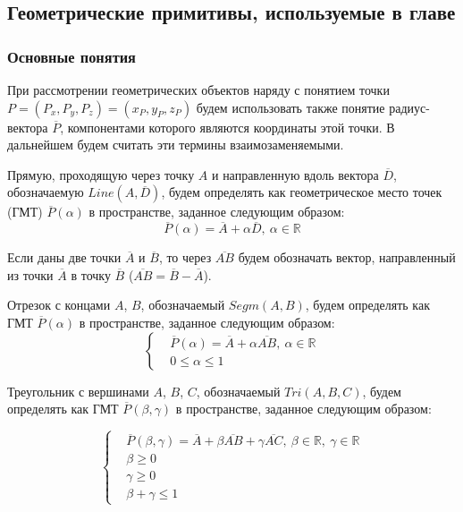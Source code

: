 \subsection{Геометрические примитивы, используемые в главе}

\subsubsection{Основные понятия}

При рассмотрении геометрических объектов наряду с понятием точки $P = (P_x, P_y, P_z) = (x_P, y_P, z_P)$ будем использовать также понятие радиус-вектора $\overline{P}$, компонентами которого являются координаты этой точки.
В дальнейшем будем считать эти термины взаимозаменяемыми.

Прямую, проходящую через точку $A$ и направленную вдоль вектора $\overline{D}$, обозначаемую $Line(A, \overline{D})$, будем определять как геометрическое место точек\label{term:gmt} (ГМТ\label{abbr:gmt}) $\overline{P}(\alpha)$ в пространстве, заданное следующим образом:
\begin{equation}\label{eqn:text_1_geo_prim_line}
	\overline{P}(\alpha) = \overline{A} + \alpha \overline{D}, \ \alpha \in \mathbb{R}
\end{equation}

Если даны две точки $\overline{A}$ и $\overline{B}$, то через $\overline{AB}$ будем обозначать вектор, направленный из точки $\overline{A}$ в точку $\overline{B}$ ($\overline{AB} = \overline{B} - \overline{A}$).

Отрезок с концами $A$, $B$, обозначаемый $Segm(A, B)$, будем определять как ГМТ $\overline{P}(\alpha)$ в пространстве, заданное следующим образом:
\begin{equation}\label{eqn:text_1_geo_prim_segment}
	\left\{
		\begin{aligned}
			& \overline{P}(\alpha) = \overline{A} + \alpha \overline{AB}, \ \alpha \in \mathbb{R} \\
			& 0 \le \alpha \le 1
		\end{aligned}
	\right.
\end{equation}

Треугольник с вершинами $A$, $B$, $C$, обозначаемый $Tri(A, B, C)$, будем определять как ГМТ $\overline{P}(\beta, \gamma)$ в пространстве, заданное следующим образом:

\begin{equation}\label{eqn:text_1_geo_prim_triangle}
	\left\{
		\begin{aligned}
			& \overline{P}(\beta, \gamma) = \overline{A} + \beta \overline{AB} + \gamma \overline{AC}, \ \beta \in \mathbb{R}, \ \gamma \in \mathbb{R} \\
			& \beta \ge 0 \\
			& \gamma \ge 0 \\
			& \beta + \gamma \le 1
		\end{aligned}
	\right.
\end{equation}


